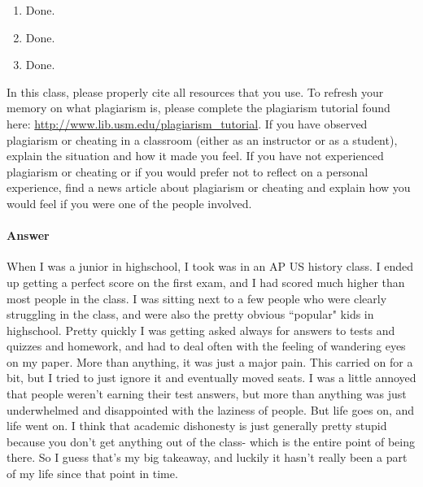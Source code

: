 \documentclass{article}
\begin{document}
\begin{enumerate}
	\item Done.
	\item Done.
	\item Done.
\end{enumerate}



\nextprob
\collab{}

    In this class,
    please properly cite all resources that you use.
    To refresh your memory on what plagiarism is,
    please
    complete the plagiarism tutorial found here:
    \url{http://www.lib.usm.edu/plagiarism_tutorial}.
    If you have observed plagiarism or cheating in a classroom (either as an
    instructor or as a student), explain the situation and how it made you
    feel.  If you have not experienced plagiarism or cheating or if you would
    prefer not to reflect on a personal experience, find a news
    article about plagiarism or cheating and explain how you would feel if you
    were one of the people involved.


\paragraph{Answer}


When I was a junior in highschool, I took was in an AP US history class. I ended up 
getting a perfect score on the first exam, and I had scored much higher than most people
in the class. I was sitting next to a few people who were clearly struggling in the class,
and were also the pretty obvious ``popular" kids in highschool. Pretty quickly I was getting 
asked always for answers to tests and quizzes and homework, and had to deal often with the
feeling of wandering eyes on my paper. More than anything, it was just a major pain. This carried
on for a bit, but I tried to just ignore it and eventually moved seats. I was a little annoyed that
people weren't earning their test answers, but more than anything was just underwhelmed and disappointed
with the laziness of people. But life goes on, and life went on. I think that academic dishonesty
is just generally pretty stupid because you don't get anything out of the class- which is the entire
point of being there. So I guess that's my big takeaway, and luckily it hasn't really been a part of my life
since that point in time.

\end{document}
